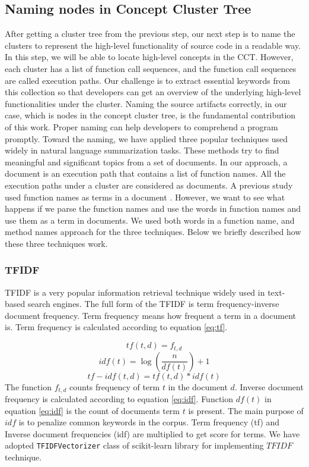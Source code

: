 \subsection{Naming nodes in Concept Cluster Tree}
\label{approach_naming}
After getting a cluster tree from the previous step, our next step is to name the clusters to represent the high-level functionality of source code in a readable way. In this step, we will be able to locate high-level concepts in the CCT. However, each cluster has a list of function call sequences, and the function call sequences are called execution paths. Our challenge is to extract essential keywords from this collection so that developers can get an overview of the underlying high-level functionalities under the cluster. Naming the source artifacts correctly, in our case, which is nodes in the concept cluster tree, is the fundamental contribution of this work. Proper naming can help developers to comprehend a program promptly. Toward the naming, we have applied three popular techniques used widely in natural language summarization tasks. These methods try to find meaningful and significant topics from a set of documents. In our approach, a document is an execution path that contains a list of function names. All the execution paths under a cluster are considered as documents.
A previous study used function names as terms in a document \cite{gharibi2018automatic}. However, we want to see what happens if we parse the function names and use the words in function names and use them as a term in documents. We used both words in a function name, and method names approach for the three techniques. Below we briefly described how these three techniques work. 

\subsubsection{TFIDF}
TFIDF \cite{ramos2003using} is a very popular information retrieval technique widely used in text-based search engines. The full form of the TFIDF is term frequency-inverse document frequency. Term frequency means how frequent a term in a document is. Term frequency is calculated according to equation \ref{eq:tf}.

\begin{equation}
    tf(t,d) = f_{t,d}
    \label{eq:tf}
\end{equation}
\begin{equation}
    idf(t) = \log(\frac{n}{df(t)})+1
    \label{eq:idf}
\end{equation}
\begin{equation}
    tf-idf(t,d) = tf(t,d) * idf(t)
    \label{eq:TFIDF}
\end{equation}
The function $f_{t,d}$ counts frequency of term $t$ in the document $d$. Inverse document frequency is calculated according to equation \ref{eq:idf}. Function $df(t)$ in equation \ref{eq:idf} is the count of documents term $t$ is present. The main purpose of $idf$ is to penalize common keywords in the corpus. Term frequency (tf) and Inverse document frequencies (idf) are multiplied to get score for terms. We have adopted \texttt{TFIDFVectorizer} class of scikit-learn \cite{scikit-learn} library for implementing $TFIDF$ technique.
